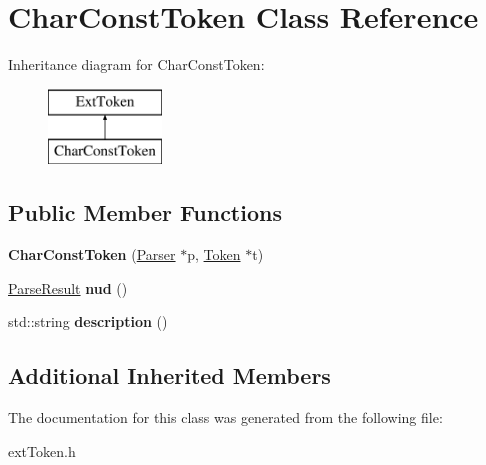 \hypertarget{class_char_const_token}{}\section{Char\+Const\+Token Class Reference}
\label{class_char_const_token}
Inheritance diagram for Char\+Const\+Token\+:\begin{figure}[H]
\begin{center}
\leavevmode
\includegraphics[height=2.000000cm]{class_char_const_token}
\end{center}
\end{figure}
\subsection*{Public Member Functions}
\begin{DoxyCompactItemize}
\item 
\hypertarget{class_char_const_token_a9dcb8d0d26c4f9c66570357641933c51}{}{\bfseries Char\+Const\+Token} (\hyperlink{class_parser}{Parser} $\ast$p, \hyperlink{class_token}{Token} $\ast$t)\label{class_char_const_token_a9dcb8d0d26c4f9c66570357641933c51}

\item 
\hypertarget{class_char_const_token_a33032d6b35ef2b6ebc4db770b374ad5b}{}\hyperlink{class_parse_result}{Parse\+Result} {\bfseries nud} ()\label{class_char_const_token_a33032d6b35ef2b6ebc4db770b374ad5b}

\item 
\hypertarget{class_char_const_token_addf2603d51bc2be908137f06737d8b30}{}std\+::string {\bfseries description} ()\label{class_char_const_token_addf2603d51bc2be908137f06737d8b30}

\end{DoxyCompactItemize}
\subsection*{Additional Inherited Members}


The documentation for this class was generated from the following file\+:\begin{DoxyCompactItemize}
\item 
ext\+Token.\+h\end{DoxyCompactItemize}
